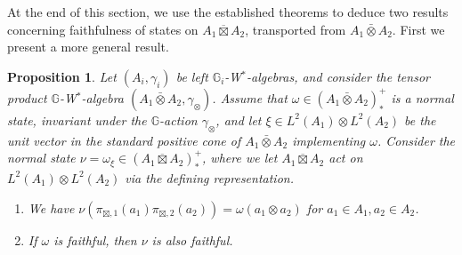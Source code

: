 \documentclass[reqno]{amsart}
\numberwithin{equation}{section}
\newtheorem{Prop}[Theorem]{Proposition}
\newcommand{\G}{\mathbb{G}}
\newcommand{\ov}{\overline}
\begin{document}
At the end of this section, we use the established theorems to deduce two results concerning faithfulness of states on $A_1\ov\boxtimes A_2$, transported from $A_1\bar\otimes A_2$. First we present a more general result.

\begin{Prop}\label{prop2}
Let $(A_i,\gamma_i)$ be left $\G_i$-W$^*$-algebras, and consider the tensor product $\G$-W$^*$-algebra $ (A_1\bar{\otimes}A_2,\gamma_{\otimes})$. Assume that $\omega\in (A_1\bar\otimes A_2)_*^+$ is a normal state, invariant under the $\G$-action $\gamma_\otimes$, and let $\xi\in L^2(A_1)\otimes L^2( A_2)$ be the unit vector in the standard positive cone of $A_1\bar\otimes A_2$ implementing $\omega$. Consider the normal state $\nu=\omega_{\xi}\in (A_1\ov\boxtimes A_2)_*^+$, where we let $A_1\ov\boxtimes A_2$ act on $L^2(A_1)\otimes L^2(A_2)$ via the defining representation.
\begin{enumerate}
\item We have $\nu(\pi_{\boxtimes,1}(a_1)\pi_{\boxtimes,2}(a_2))=\omega(a_1\otimes a_2)$ for $a_1\in A_1,a_2\in A_2$.
\item If $\omega$ is faithful, then $\nu$ is also faithful.
\end{enumerate}
\end{Prop}
\end{document}
